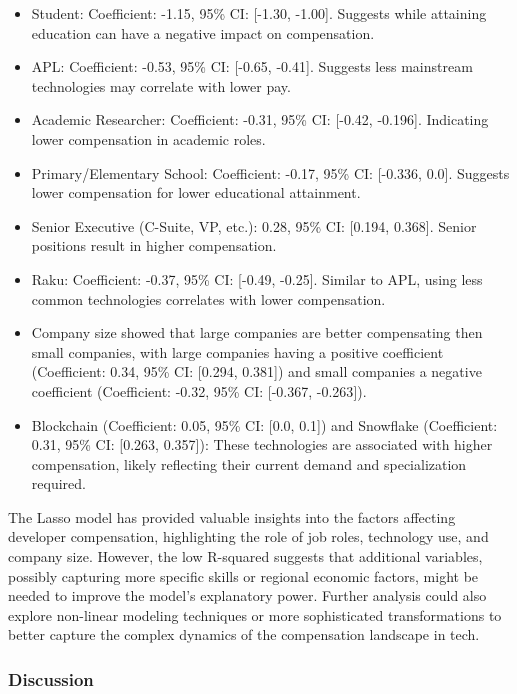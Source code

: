 \documentclass[
  12pt,
]{article}
\providecommand{\tightlist}{%
  \setlength{\itemsep}{0pt}\setlength{\parskip}{0pt}}
\begin{document}
\begin{itemize}
\tightlist
\item
  Student: Coefficient: -1.15, 95\% CI: {[}-1.30, -1.00{]}. Suggests
  while attaining education can have a negative impact on compensation.
\item
  APL: Coefficient: -0.53, 95\% CI: {[}-0.65, -0.41{]}. Suggests less
  mainstream technologies may correlate with lower pay.
\item
  Academic Researcher: Coefficient: -0.31, 95\% CI: {[}-0.42, -0.196{]}.
  Indicating lower compensation in academic roles.
\item
  Primary/Elementary School: Coefficient: -0.17, 95\% CI: {[}-0.336,
  0.0{]}. Suggests lower compensation for lower educational attainment.
\item
  Senior Executive (C-Suite, VP, etc.): 0.28, 95\% CI: {[}0.194,
  0.368{]}. Senior positions result in higher compensation.
\item
  Raku: Coefficient: -0.37, 95\% CI: {[}-0.49, -0.25{]}. Similar to APL,
  using less common technologies correlates with lower compensation.
\item
  Company size showed that large companies are better compensating then
  small companies, with large companies having a positive coefficient
  (Coefficient: 0.34, 95\% CI: {[}0.294, 0.381{]}) and small companies a
  negative coefficient (Coefficient: -0.32, 95\% CI: {[}-0.367,
  -0.263{]}).
\item
  Blockchain (Coefficient: 0.05, 95\% CI: {[}0.0, 0.1{]}) and Snowflake
  (Coefficient: 0.31, 95\% CI: {[}0.263, 0.357{]}): These technologies
  are associated with higher compensation, likely reflecting their
  current demand and specialization required.
\end{itemize}

The Lasso model has provided valuable insights into the factors
affecting developer compensation, highlighting the role of job roles,
technology use, and company size. However, the low R-squared suggests
that additional variables, possibly capturing more specific skills or
regional economic factors, might be needed to improve the model's
explanatory power. Further analysis could also explore non-linear
modeling techniques or more sophisticated transformations to better
capture the complex dynamics of the compensation landscape in tech.

\hypertarget{discussion}{%
\subsubsection{Discussion}\label{discussion}}
\end{document}
